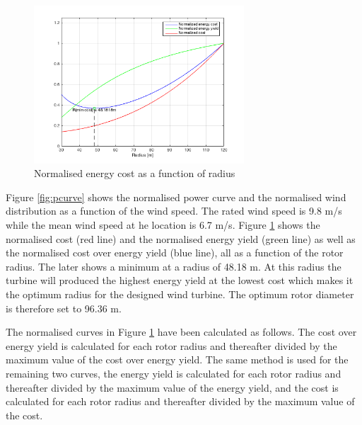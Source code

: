 \begin{figure}[H]
\centering
\includegraphics[width=0.7\textwidth]{Images/cost_ey.png} 
\caption{Normalised energy cost as a function of radius}\label{fig:costey}
\end{figure}

Figure \ref{fig:pcurve} shows the normalised power curve and the normalised wind distribution as a function of the wind speed. The rated wind speed is 9.8 m/s while the mean wind speed at he location is 6.7 m/s. Figure \ref{fig:costey} shows the normalised cost (red line) and the normalised energy yield (green line) as well as the normalised cost over energy yield (blue line), all as a function of the rotor radius. The later shows a minimum at a radius of 48.18 m. At this radius the turbine will produced the highest energy yield at the lowest cost which makes it the optimum radius for the designed wind turbine. The optimum rotor diameter is therefore set to 96.36 m.

The normalised curves in Figure \ref{fig:costey} have been calculated as follows. The cost over energy yield is calculated for each rotor radius and thereafter divided by the maximum value of the cost over energy yield. The same method is used for the remaining two curves, the energy yield is calculated for each rotor radius and thereafter divided by the maximum value of the energy yield, and the cost is calculated for each rotor radius and thereafter divided by the maximum value of the cost.